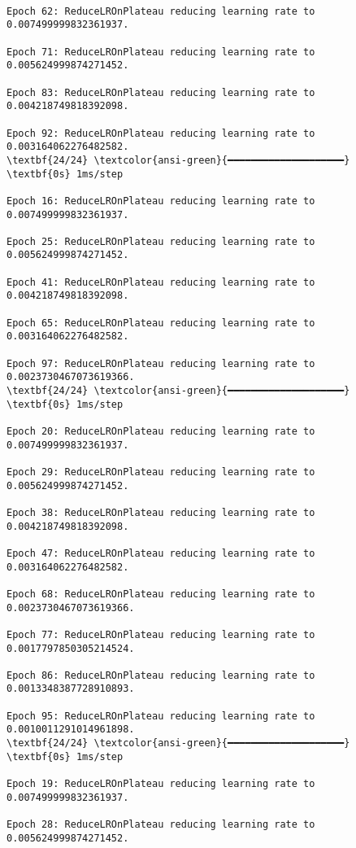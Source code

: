 \documentclass[11pt]{article}
\begin{document}
    \begin{Verbatim}[commandchars=\\\{\}]

Epoch 62: ReduceLROnPlateau reducing learning rate to 0.007499999832361937.

Epoch 71: ReduceLROnPlateau reducing learning rate to 0.005624999874271452.

Epoch 83: ReduceLROnPlateau reducing learning rate to 0.004218749818392098.

Epoch 92: ReduceLROnPlateau reducing learning rate to 0.003164062276482582.
\textbf{24/24} \textcolor{ansi-green}{━━━━━━━━━━━━━━━━━━━━} \textbf{0s} 1ms/step

Epoch 16: ReduceLROnPlateau reducing learning rate to 0.007499999832361937.

Epoch 25: ReduceLROnPlateau reducing learning rate to 0.005624999874271452.

Epoch 41: ReduceLROnPlateau reducing learning rate to 0.004218749818392098.

Epoch 65: ReduceLROnPlateau reducing learning rate to 0.003164062276482582.

Epoch 97: ReduceLROnPlateau reducing learning rate to 0.0023730467073619366.
\textbf{24/24} \textcolor{ansi-green}{━━━━━━━━━━━━━━━━━━━━} \textbf{0s} 1ms/step

Epoch 20: ReduceLROnPlateau reducing learning rate to 0.007499999832361937.

Epoch 29: ReduceLROnPlateau reducing learning rate to 0.005624999874271452.

Epoch 38: ReduceLROnPlateau reducing learning rate to 0.004218749818392098.

Epoch 47: ReduceLROnPlateau reducing learning rate to 0.003164062276482582.

Epoch 68: ReduceLROnPlateau reducing learning rate to 0.0023730467073619366.

Epoch 77: ReduceLROnPlateau reducing learning rate to 0.0017797850305214524.

Epoch 86: ReduceLROnPlateau reducing learning rate to 0.0013348387728910893.

Epoch 95: ReduceLROnPlateau reducing learning rate to 0.0010011291014961898.
\textbf{24/24} \textcolor{ansi-green}{━━━━━━━━━━━━━━━━━━━━} \textbf{0s} 1ms/step

Epoch 19: ReduceLROnPlateau reducing learning rate to 0.007499999832361937.

Epoch 28: ReduceLROnPlateau reducing learning rate to 0.005624999874271452.


\end{Verbatim}
\end{document}
